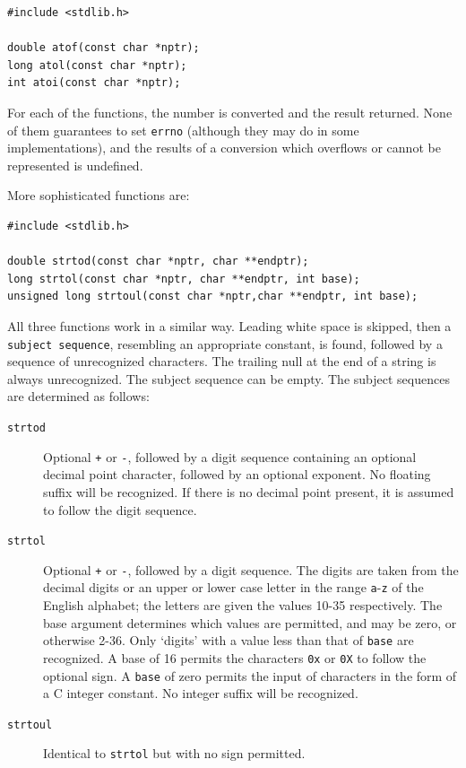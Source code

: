    \begin{Verbatim}
#include <stdlib.h>

double atof(const char *nptr);
long atol(const char *nptr);
int atoi(const char *nptr);
\end{Verbatim}

   For each of the functions, the number is converted  and  the result
    returned.   None  of  them  guarantees  to set \texttt{errno} (although
    they may do  in  some  implementations),  and  the results  of
    a  conversion  which  overflows  or  cannot  be represented is
    undefined.


   More sophisticated functions are:


   \begin{Verbatim}
#include <stdlib.h>

double strtod(const char *nptr, char **endptr);
long strtol(const char *nptr, char **endptr, int base);
unsigned long strtoul(const char *nptr,char **endptr, int base);
\end{Verbatim}

   All three functions work in a similar  way.   Leading  white space  is
    skipped,  then  a \texttt{subject sequence}, resembling an appropriate
    constant, is found, followed by  a  sequence  of unrecognized  characters.
    The trailing null at the end of a string is always unrecognized.  The
    subject sequence can  be empty.  The subject sequences are determined as
    follows:


   \begin{description}
    \item[\texttt{strtod}] Optional \texttt{+} or \texttt{-}, followed by a digit sequence
     containing an  optional  decimal  point  character,  followed  by an
     optional  exponent.    No   floating   suffix   will   be recognized.   If
     there is no decimal point present, it is assumed to follow the digit
     sequence.

    \item[\texttt{strtol}] Optional \texttt{+} or \texttt{-},  followed  by  a  digit
     sequence.   The digits  are  taken from the decimal digits or an upper or
     lower case  letter  in  the  range  \texttt{a}-\texttt{z}
     of  the  English alphabet;   the   letters  are  given  the  values
     10-35 respectively.  The base argument determines which  values are
     permitted, and may be zero, or otherwise 2-36.  Only `digits'
     with  a  value  less  than  that  of  \texttt{base}  are recognized.
     A base of 16 permits the characters \texttt{0x} or
     \texttt{0X} to follow the optional sign.  A \texttt{base} of
     zero permits  the input  of characters in the form of a C integer
     constant.  No integer suffix will be recognized.

    \item[\texttt{strtoul}] Identical to \texttt{strtol} but with no sign permitted.
   \end{description}

